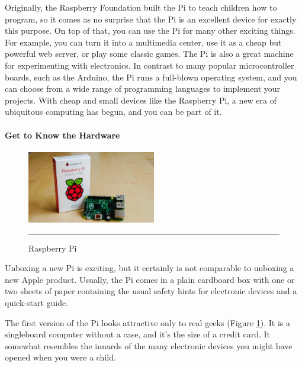 Originally, the Raspberry Foundation \citep{2} built the Pi to teach children how to
program, so it comes as no surprise that the Pi is an excellent device for
exactly this purpose. 
On top of that, you can use the Pi for many other
exciting things. For example, you can turn it into a multimedia center, use it as a cheap but powerful web server, or play some classic games.
The Pi is also a great machine for experimenting with electronics. In contrast
to many popular microcontroller boards, such as the Arduino, the Pi runs a
full-blown operating system, and you can choose from a wide range of programming
languages to implement your projects.
With cheap and small devices like the Raspberry Pi, a new era of ubiquitous
computing has begun, and you can be part of it.



\paragraph*{Get to Know the Hardware}

\begin{figure}
\vspace{15pt}
  \begin{center}
    \includegraphics[width=0.5\textwidth]{./Pictures/unboxing_pi.jpg}
  \end{center}
  \rule{0.5\textwidth}{0.5pt}
  \caption{Raspberry Pi }
  \label{fig:unboxing_pi}
\end{figure}

\hfill \break
Unboxing a new Pi is exciting, but it certainly is not comparable to unboxing
a new Apple product. Usually, the Pi comes in a plain cardboard box with
one or two sheets of paper containing the usual safety hints for electronic
devices and a quick-start guide.

The first version of the Pi looks attractive only to real geeks (Figure \ref{fig:unboxing_pi}). It is a singleboard
computer without a case, and it’s the size of a credit card. It somewhat
resembles the innards of the many electronic devices you might have opened
when you were a child.

